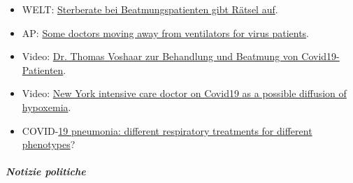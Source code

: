 \begin{itemize}
\tightlist
\item
  WELT:
  \href{https://www.welt.de/vermischtes/article207221877/Corona-Pandemie-Sterberate-bei-Beatmungspatienten-gibt-Raetsel-auf.html}{Sterberate
  bei Beatmungspatienten gibt Rätsel auf}.
\item
  AP: \href{https://apnews.com/8ccd325c2be9bf454c2128dcb7bd616d}{Some
  doctors moving away from ventilators for virus patients}.
\item
  Video: \href{https://www.youtube.com/watch?v=QPlEUAVjxV8}{Dr. Thomas
  Voshaar zur Behandlung und Beatmung von Covid19-Patienten}.
\item
  Video: \href{https://www.youtube.com/watch?v=NmRlvX3VrAQ}{New York
  intensive care doctor on Covid19 as a possible diffusion of
  hypoxemia}.
\item
  COVID-\href{https://link.springer.com/article/10.1007/s00134-020-06033-2}{19
  pneumonia: different respiratory treatments for different phenotypes}?
\end{itemize}

\hypertarget{notizie-politiche}{%
\subparagraph{\texorpdfstring{\textbf{Notizie
politiche}}{Notizie politiche}}\label{notizie-politiche}}

